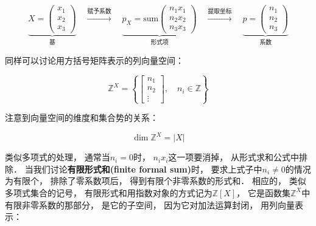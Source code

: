 \documentclass[10pt, openany]{book}
\begin{document}
\begin{equation}
\underbrace{X=\begin{pmatrix}x_1 \\ x_2 \\ x_3\end{pmatrix}}_{\text{基}}
\quad \xrightarrow{\text{赋予系数}} \quad
\underbrace{p_X=\text{sum}\begin{pmatrix}n_1 x_1 \\ n_2 x_2 \\ n_3 x_3\end{pmatrix}}_{\text{形式项}}
\quad \xrightarrow{\text{提取坐标}} \quad
\underbrace{p=\begin{pmatrix}n_1 \\ n_2 \\ n_3\end{pmatrix}}_{\text{系数}}
\end{equation}\label{eq:formal-sum-vector}

同样可以讨论用方括号矩阵表示的列向量空间：

$$
\mathbb Z^X = \left\{ \begin{bmatrix} n_1 \\ n_2 \\ \vdots \end{bmatrix}, \quad n_i \in \mathbb Z \right\}
$$

注意到向量空间的维度和集合势的关系：

\begin{equation}
\dim \mathbb Z^X = |X|
\end{equation}\label{eq:dim-card-Z}

类似多项式的处理，
通常当$n_i=0$时，
$n_i x_i$这一项要消掉，
从形式求和公式中排除．
当我们讨论\textbf{有限形式和(finite formal sum)}时，
要求上式子中$n_i \neq 0$的情况为有限个，
排除了零系数项后，
得到有限个非零系数的形式和．
相应的，
类似多项式集合的记号，
有限形式和用指数对象的方式记为$\mathbb Z[X]$，
它是函数集$\mathbb Z^X$中有限非零系数的那部分，
是它的子空间，
因为它对加法运算封闭，
用列向量表示：
\end{document}

